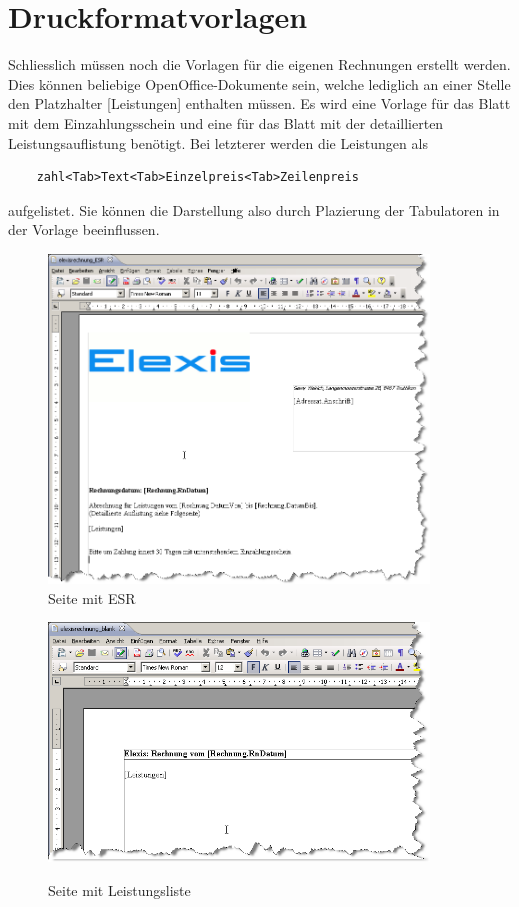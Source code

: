 \documentclass[a4paper]{scrartcl}
\begin{document}
\section{Druckformatvorlagen}
Schliesslich müssen noch die Vorlagen für die eigenen Rechnungen erstellt werden. Dies können beliebige OpenOffice-Dokumente sein, welche lediglich an einer Stelle den Platzhalter [Leistungen] enthalten müssen.
Es wird eine Vorlage für das Blatt mit dem Einzahlungsschein und eine für das Blatt mit der detaillierten Leistungsauflistung benötigt. Bei letzterer werden die Leistungen als
\begin{verbatim}
    zahl<Tab>Text<Tab>Einzelpreis<Tab>Zeilenpreis
\end{verbatim}
aufgelistet. Sie können die Darstellung also durch Plazierung  der Tabulatoren in der Vorlage beeinflussen.
\begin{figure}
    \begin{minipage}{0.5\textwidth}
    \includegraphics[width=0.9\textwidth]{privatrechnung5}\\
      \caption{Seite mit ESR}
    \end{minipage}
    \begin{minipage}{0.5\textwidth}
    \includegraphics[width=0.9\textwidth]{privatrechnung6}\\
      \caption{Seite mit Leistungsliste}
    \end{minipage}
\end{figure}
\end{document}
